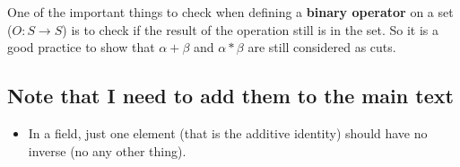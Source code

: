 One of the important things to check when defining a \textbf{binary operator} on a set ($O: S \rightarrow S$) is to check if the result of the operation still is in the set. So it is a good practice to show that $\alpha + \beta$ and $\alpha * \beta$ are still considered as cuts. 


\subsection{Note that I need to add them to the main text}
\begin{itemize}
	\item In a field, just one element (that is the additive identity) should have no inverse (no any other thing).
\end{itemize}

